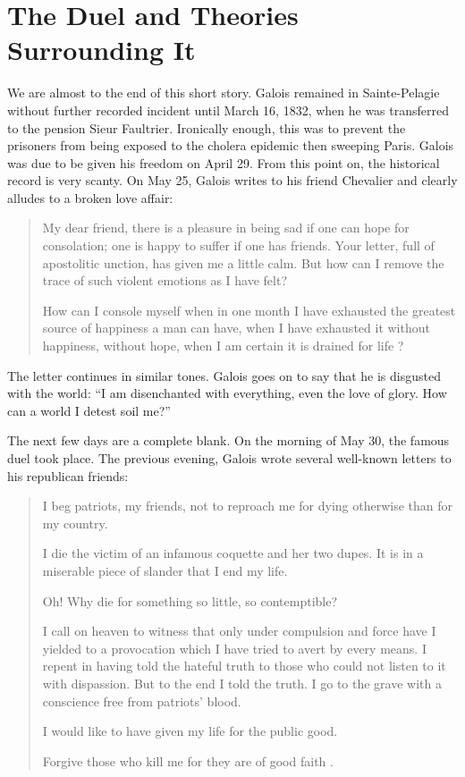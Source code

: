 \documentclass[12pt]{article}
\begin{document}
\section{The Duel and Theories Surrounding It}

We are almost to the end of this short story. Galois remained in Sainte-Pelagie without further recorded incident until March 16, 1832, when he was transferred to the pension Sieur Faultrier. Ironically enough, this was to prevent the prisoners from being exposed to the cholera epidemic then sweeping Paris. Galois was due to be given his freedom on April 29. From this point on, the historical record is very scanty. On May 25, Galois writes to his friend Chevalier and clearly alludes to a broken love affair:

\begin{quotation}

My dear friend, there is a pleasure in being sad if one can hope for consolation; one is happy to suffer if one has friends. Your letter, full of apostolitic unction, has given me a little calm. But how can I remove the trace of such violent emotions as I have felt? 

How can I console myself when in one month I have exhausted the greatest source of happiness a man can have, when I have exhausted it without happiness, without hope, when I am certain it is drained for life \cite{76}?
\end{quotation}

The letter continues in similar tones. Galois goes on to say that he is disgusted with the world: ``I am disenchanted with everything, even the love of glory. How can a world I detest soil me?'' \cite{77}

The next few days are a complete blank. On the morning of May 30, the famous duel took place. The previous evening, Galois wrote several well-known letters to his republican friends:

\begin{quotation}
I beg patriots, my friends, not to reproach me for dying otherwise than for my country. 

I die the victim of an infamous coquette and her two dupes. It is in a miserable piece of slander that I end my life. 

Oh! Why die for something so little, so contemptible? 

I call on heaven to witness that only under compulsion and force have I yielded to a provocation which I have tried to avert by every means. I repent in having told the hateful truth to those who could not listen to it with dispassion. But to the end I told the truth. I go to the grave with a conscience free from patriots' blood. 

I would like to have given my life for the public good. 

Forgive those who kill me for they are of good faith \cite{78}.
\end{quotation}
\end{document}
